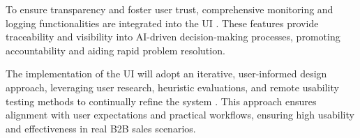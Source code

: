 To ensure transparency and foster user trust, comprehensive monitoring and logging functionalities are integrated into the UI \cite{bosch2020engineering}. These features provide traceability and visibility into AI-driven decision-making processes, promoting accountability and aiding rapid problem resolution.

The implementation of the UI will adopt an iterative, user-informed design approach, leveraging user research, heuristic evaluations, and remote usability testing methods to continually refine the system \cite{costa2022interaction}. This approach ensures alignment with user expectations and practical workflows, ensuring high usability and effectiveness in real B2B sales scenarios.
